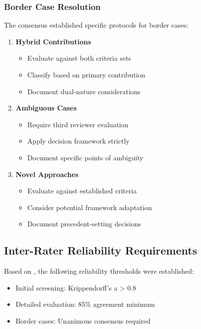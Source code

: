 \documentclass[a4paper,12pt]{article}
\begin{document}
\begin{enumerate}
\subsubsection{Border Case Resolution}
The consensus established specific protocols for border cases:

\begin{enumerate}
    \item \textbf{Hybrid Contributions}
    \begin{itemize}
        \item Evaluate against both criteria sets
        \item Classify based on primary contribution
        \item Document dual-nature considerations
    \end{itemize}

    \item \textbf{Ambiguous Cases}
    \begin{itemize}
        \item Require third reviewer evaluation
        \item Apply decision framework strictly
        \item Document specific points of ambiguity
    \end{itemize}

    \item \textbf{Novel Approaches}
    \begin{itemize}
        \item Evaluate against established criteria
        \item Consider potential framework adaptation
        \item Document precedent-setting decisions
    \end{itemize}
\end{enumerate}

\subsection{Inter-Rater Reliability Requirements}
Based on \citet{krippendorff2004reliability}, the following reliability thresholds were established:

\begin{itemize}
    \item Initial screening: Krippendorff's a > 0.8
    \item Detailed evaluation: 85\% agreement minimum
    \item Border cases: Unanimous consensus required
\end{itemize}


\end{enumerate}
\end{document}
